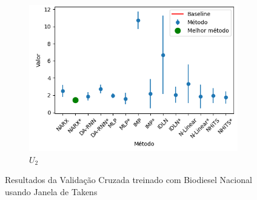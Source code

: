 \begin{figure}[htbp]
\begin{subfigure}[b]{0.3\textwidth}
		\includegraphics[width=\textwidth]{figuras/u2_takens_brasil_results.png}
		\caption{\(U_2\)}
		\label{fig:u2_takens_brasil_results}
	\end{subfigure}
	\caption{Resultados da Validação Cruzada treinado com Biodiesel Nacional usando Janela de Takens}
	\label{fig:takens_brasil_results}
\end{figure}
